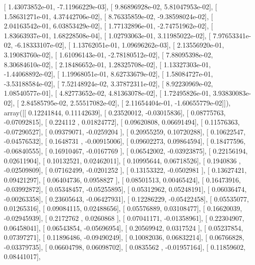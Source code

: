 \documentclass{article}
\begin{document}
       [  1.43073852e-01,  -7.11966229e-03],
       [  9.86896928e-02,   5.81047953e-02],
       [  1.58631271e-01,   4.37442706e-02],
       [  8.76335859e-02,  -9.38598024e-02],
       [  2.04163542e-01,   6.03853429e-02],
       [  1.77132896e-01,  -2.74751962e-02],
       [  1.83663937e-01,   1.68228508e-04],
       [  1.02793063e-01,   3.11985022e-02],
       [  7.97653341e-02,  -6.18333107e-02],
       [  1.13762051e-01,   1.09696262e-03],
       [  2.13556920e-01,   3.19083760e-02],
       [  1.61096143e-01,  -2.78180512e-02],
       [  7.88095398e-02,   8.30684610e-02],
       [  2.18486652e-01,   1.28325708e-02],
       [  1.13327303e-01,  -1.44068892e-02],
       [  1.19968051e-01,   8.62733679e-02],
       [  1.58084727e-01,  -3.53188584e-02],
       [  7.52148924e-02,   3.37872311e-02],
       [  8.92230969e-02,   1.08540577e-01],
       [  4.82773652e-02,   4.81363078e-02],
       [  1.72495826e-01,   3.93830083e-02],
       [  2.84585795e-02,   2.55517082e-02],
       [  2.11654404e-01,  -1.60655779e-02]]), array([[ 0.12241844,  0.11142639],
       [ 0.23520012, -0.03015836],
       [ 0.08775763, -0.07092815],
       [ 0.224112  ,  0.01824772],
       [ 0.09620808,  0.06691494],
       [ 0.11576363, -0.07290527],
       [ 0.09379071, -0.0259204 ],
       [ 0.20955259,  0.10720288],
       [ 0.10622547, -0.04576532],
       [ 0.1648731 , -0.00915006],
       [ 0.09602273,  0.09864594],
       [ 0.18477596, -0.06840555],
       [ 0.16910467, -0.0167769 ],
       [ 0.06542002, -0.03923875],
       [ 0.22156194,  0.02611904],
       [ 0.10132521,  0.02462011],
       [ 0.10995644,  0.06718526],
       [ 0.1940836 , -0.02509809],
       [ 0.07162499, -0.0201252 ],
       [ 0.13153322, -0.0502981 ],
       [ 0.13627421,  0.09421297],
       [ 0.06404736,  0.0958827 ],
       [ 0.08501513,  0.00465424],
       [ 0.16473916, -0.03992872],
       [ 0.05348457, -0.05255895],
       [ 0.05312962,  0.05248191],
       [ 0.06036474, -0.00263358],
       [ 0.23605643, -0.06427931],
       [ 0.12286229, -0.05422458],
       [ 0.05535077,  0.01265316],
       [ 0.09084115,  0.02488656],
       [ 0.05576889,  0.03108477],
       [ 0.16620039, -0.02945939],
       [ 0.2172762 ,  0.0260868 ],
       [ 0.07041171, -0.01358961],
       [ 0.22304907,  0.06458041],
       [ 0.06543854, -0.05696954],
       [ 0.20569942,  0.0317524 ],
       [ 0.05237854,  0.07397271],
       [ 0.11896486, -0.09490249],
       [ 0.10082036,  0.06832214],
       [ 0.06766828, -0.03379735],
       [ 0.06604798,  0.06098702],
       [ 0.0835562 , -0.01957164],
       [ 0.11859602,  0.08441017],
\end{document}
